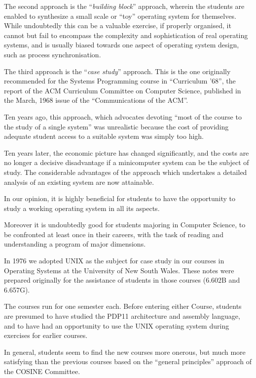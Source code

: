 The second approach is the ``{\it building
block}'' approach, wherein the students
are enabled to synthesize a small scale
or ``toy'' operating system for themselves. While undoubtedly this can be a
valuable exercise, if properly organised, it cannot but fail to encompass
the complexity and sophistication of
real operating systems, and is usually
biased towards one aspect of operating
system design, such as process synchronisation.

The third approach is the ``{\it case study}''
approach. This is the one originally
recommended for the Systems Programming
course in ``Curriculum '68'', the report
of the ACM Curriculum Committee on Computer Science, published in the March,
1968 issue of the ``Communications of
the ACM''.

Ten years ago, this approach, which
advocates devoting ``most of the course
to the study of a single system'' was
unrealistic because the cost of providing adequate student access to a suitable system was simply too high.

Ten years later, the economic picture
has changed significantly, and the
costs are no longer a decisive disadvantage if a minicomputer system can be
the subject of study. The considerable
advantages of the approach which undertakes a detailed analysis of an existing system are now attainable.

In our opinion, it is highly beneficial
for students to have the opportunity to
study a working operating system in all
its aspects.

Moreover it is undoubtedly good for
students majoring in Computer Science,
to be confronted at least once in their
careers, with the task of reading and
understanding a program of major dimensions.

In 1976 we adopted UNIX as the subject
for case study in our courses in
Operating Systems at the University of
New South Wales. These notes were
prepared originally for the assistance
of students in those courses (6.602B
and 6.657G).

The courses run for one semester each.
Before entering either Course, students
are presumed to have studied the PDP11
architecture and assembly language, and
to have had an opportunity to use the
UNIX operating system during exercises
for earlier courses.

In general, students seem to find the
new courses more onerous, but much more
satisfying than the previous courses
based on the ``general principles''
approach of the COSINE Committee.


